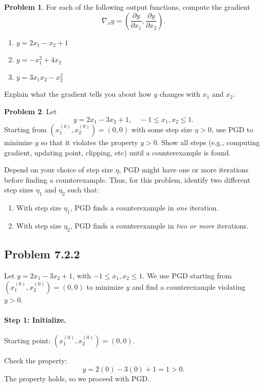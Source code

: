\documentclass[oneside,11pt,dvipsnames]{book}
\numberwithin{equation}{section}
\theoremstyle{definition}
\newtheorem{problem}{Problem}[section]
\theoremstyle{remark}
\newenvironment{solution}{%
  \ifbool{showsol}{%
    \begin{mysolbox}%
        {\small \textbf{Solution}: }
  }{%
    \comment %
  }%
}{%
  \ifbool{showsol}{%
    \end{mysolbox}%
  }{%
    \endcomment %
  }%
}
\begin{document}
\begin{problem}\label{prob:compute-gradients}
For each of the following output functions, compute the gradient
\[
\nabla_x y = \left( \frac{\partial y}{\partial x_1}, \frac{\partial y}{\partial x_2} \right).
\]
\begin{enumerate}
    \item $y = 2x_1 - x_2 + 1$
    \item $y = -x_1^2 + 4x_2$
    \item $y = 3x_1x_2 - x_2^2$
\end{enumerate}
Explain what the gradient tells you about how $y$ changes with $x_1$ and $x_2$.
\end{problem}

\begin{problem}\label{prob:pgd-iterations}
Let
\[
y = 2x_1 - 3x_2 + 1, \quad -1 \le x_1, x_2 \le 1.
\]
Starting from $(x_1^{(0)}, x_2^{(0)}) = (0, 0)$ with some step size $\eta > 0$, use PGD to minimize $y$ so that it violates the property $y > 0$. Show all steps (e.g., computing gradient, updating point, clipping, etc) until a counterexample is found.

Depend on your choice of step size $\eta$, PGD might have one or more iterations before finding a counterexample. Thus, for this problem, identify two different step sizes $\eta_1$ and $\eta_2$ such that:
\begin{enumerate}
    \item With step size $\eta_1$, PGD finds a counterexample in \emph{one} iteration.
    \item With step size $\eta_2$, PGD finds a counterexample in \emph{two or more} iterations.
\end{enumerate}
\begin{solution}
\subsection*{Problem 7.2.2}

Let $y = 2x_1 - 3x_2 + 1$, with $-1 \leq x_1, x_2 \leq 1$.
We use PGD starting from $(x_1^{(0)}, x_2^{(0)}) = (0, 0)$ to minimize $y$ and find a counterexample violating $y > 0$.

\paragraph{Step 1: Initialize.}
Starting point: $(x_1^{(0)}, x_2^{(0)}) = (0, 0)$.

Check the property:
\[
y = 2(0) - 3(0) + 1 = 1 > 0.
\]
The property holds, so we proceed with PGD.


\end{solution}
\end{problem}
\end{document}
